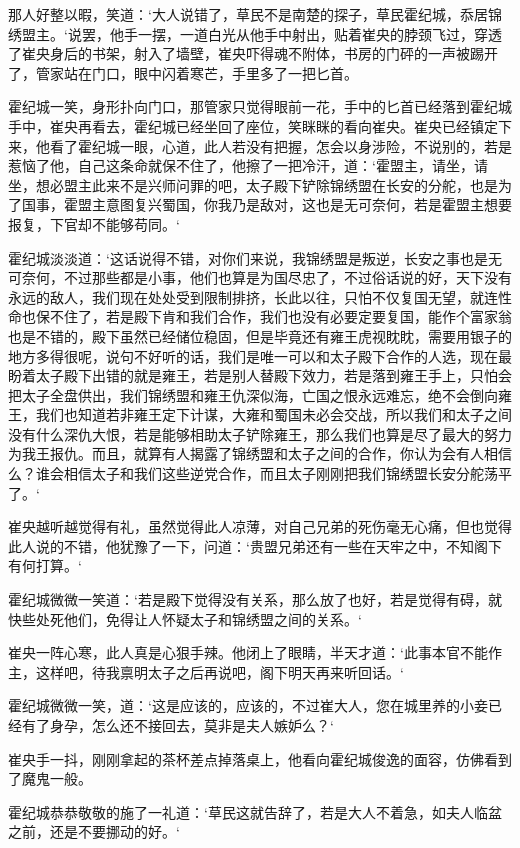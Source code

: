 那人好整以暇，笑道：‘大人说错了，草民不是南楚的探子，草民霍纪城，忝居锦绣盟主。‘说罢，他手一摆，一道白光从他手中射出，贴着崔央的脖颈飞过，穿透了崔央身后的书架，射入了墙壁，崔央吓得魂不附体，书房的门砰的一声被踢开了，管家站在门口，眼中闪着寒芒，手里多了一把匕首。

霍纪城一笑，身形扑向门口，那管家只觉得眼前一花，手中的匕首已经落到霍纪城手中，崔央再看去，霍纪城已经坐回了座位，笑眯眯的看向崔央。崔央已经镇定下来，他看了霍纪城一眼，心道，此人若没有把握，怎会以身涉险，不说别的，若是惹恼了他，自己这条命就保不住了，他擦了一把冷汗，道：‘霍盟主，请坐，请坐，想必盟主此来不是兴师问罪的吧，太子殿下铲除锦绣盟在长安的分舵，也是为了国事，霍盟主意图复兴蜀国，你我乃是敌对，这也是无可奈何，若是霍盟主想要报复，下官却不能够苟同。‘

霍纪城淡淡道：‘这话说得不错，对你们来说，我锦绣盟是叛逆，长安之事也是无可奈何，不过那些都是小事，他们也算是为国尽忠了，不过俗话说的好，天下没有永远的敌人，我们现在处处受到限制排挤，长此以往，只怕不仅复国无望，就连性命也保不住了，若是殿下肯和我们合作，我们也没有必要定要复国，能作个富家翁也是不错的，殿下虽然已经储位稳固，但是毕竟还有雍王虎视眈眈，需要用银子的地方多得很呢，说句不好听的话，我们是唯一可以和太子殿下合作的人选，现在最盼着太子殿下出错的就是雍王，若是别人替殿下效力，若是落到雍王手上，只怕会把太子全盘供出，我们锦绣盟和雍王仇深似海，亡国之恨永远难忘，绝不会倒向雍王，我们也知道若非雍王定下计谋，大雍和蜀国未必会交战，所以我们和太子之间没有什么深仇大恨，若是能够相助太子铲除雍王，那么我们也算是尽了最大的努力为我王报仇。而且，就算有人揭露了锦绣盟和太子之间的合作，你认为会有人相信么？谁会相信太子和我们这些逆党合作，而且太子刚刚把我们锦绣盟长安分舵荡平了。‘

崔央越听越觉得有礼，虽然觉得此人凉薄，对自己兄弟的死伤毫无心痛，但也觉得此人说的不错，他犹豫了一下，问道：‘贵盟兄弟还有一些在天牢之中，不知阁下有何打算。‘

霍纪城微微一笑道：‘若是殿下觉得没有关系，那么放了也好，若是觉得有碍，就快些处死他们，免得让人怀疑太子和锦绣盟之间的关系。‘

崔央一阵心寒，此人真是心狠手辣。他闭上了眼睛，半天才道：‘此事本官不能作主，这样吧，待我禀明太子之后再说吧，阁下明天再来听回话。‘

霍纪城微微一笑，道：‘这是应该的，应该的，不过崔大人，您在城里养的小妾已经有了身孕，怎么还不接回去，莫非是夫人嫉妒么？‘

崔央手一抖，刚刚拿起的茶杯差点掉落桌上，他看向霍纪城俊逸的面容，仿佛看到了魔鬼一般。

霍纪城恭恭敬敬的施了一礼道：‘草民这就告辞了，若是大人不着急，如夫人临盆之前，还是不要挪动的好。‘


